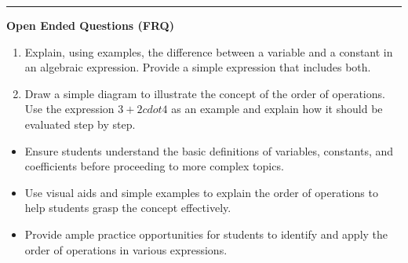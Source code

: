 \documentclass[10pt]{article}
\begin{document}
\vspace{-0.2cm}
\hrule
\vspace{0.2cm}
\textbf{\small Open Ended Questions (FRQ)}
\begin{enumerate}[label=\textbf{Q\arabic*.}, start=9, itemsep=5pt, topsep=0pt]

  \item \small Explain, using examples, the difference between a variable and a constant in an algebraic expression. Provide a simple expression that includes both. \vspace{2cm}

  \item \small Draw a simple diagram to illustrate the concept of the order of operations. Use the expression $3 + 2 cdot 4$ as an example and explain how it should be evaluated step by step. \vspace{2cm}

\end{enumerate}

\vfill

\begin{tcolorbox}[colback=blue!5, colframe=mainblue!50, title=\small \textbf{Chef's Tips}, fonttitle=\bfseries, bottom=1mm]
\begin{itemize}[noitemsep, topsep=2pt, leftmargin=0.5cm]
  \item \scriptsize Ensure students understand the basic definitions of variables, constants, and coefficients before proceeding to more complex topics.\item \scriptsize Use visual aids and simple examples to explain the order of operations to help students grasp the concept effectively.\item \scriptsize Provide ample practice opportunities for students to identify and apply the order of operations in various expressions.
\end{itemize}
\end{tcolorbox}
\end{document}
